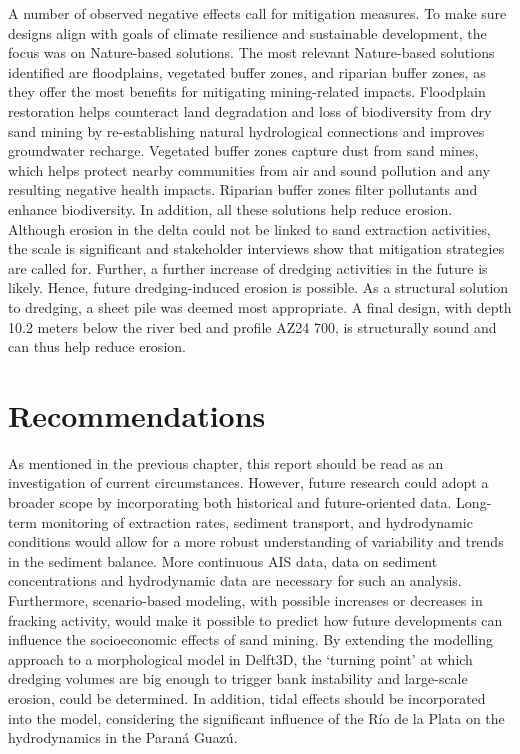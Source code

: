 A number of observed negative effects call for mitigation measures. To make sure designs align with goals of climate resilience and sustainable development, the focus was on Nature-based solutions. The most relevant Nature-based solutions identified are floodplains, vegetated buffer zones, and riparian buffer zones, as they offer the most benefits for mitigating mining-related impacts. Floodplain restoration helps counteract land degradation and loss of biodiversity from dry sand mining by re-establishing natural hydrological connections and improves groundwater recharge. Vegetated buffer zones capture dust from sand mines, which helps protect nearby communities from air and sound pollution and any resulting negative health impacts. Riparian buffer zones filter pollutants and enhance biodiversity. In addition, all these solutions help reduce erosion. Although erosion in the delta could not be linked to sand extraction activities, the scale is significant and stakeholder interviews show that mitigation strategies are called for. Further, a further increase of dredging activities in the future is likely. Hence, future dredging-induced erosion is possible. As a structural solution to dredging, a sheet pile was deemed most appropriate. A final design, with depth 10.2 meters below the river bed and profile AZ24 700, is structurally sound and can thus help reduce erosion.


\section{Recommendations}
As mentioned in the previous chapter, this report should be read as an investigation of current circumstances. However, future research could adopt a broader scope by incorporating both historical and future-oriented data. Long-term monitoring of extraction rates, sediment transport, and hydrodynamic conditions would allow for a more robust understanding of variability and trends in the sediment balance. More continuous AIS data, data on sediment concentrations and hydrodynamic data are necessary for such an analysis. Furthermore, scenario-based modeling, with possible increases or decreases in fracking activity, would make it possible to predict how future developments can influence the socioeconomic effects of sand mining. By extending the modelling approach to a morphological model in Delft3D, the `turning point' at which dredging volumes are big enough to trigger bank instability and large-scale erosion, could be determined. In addition, tidal effects should be incorporated into the model, considering the significant influence of the Río de la Plata on the hydrodynamics in the Paraná Guazú.

